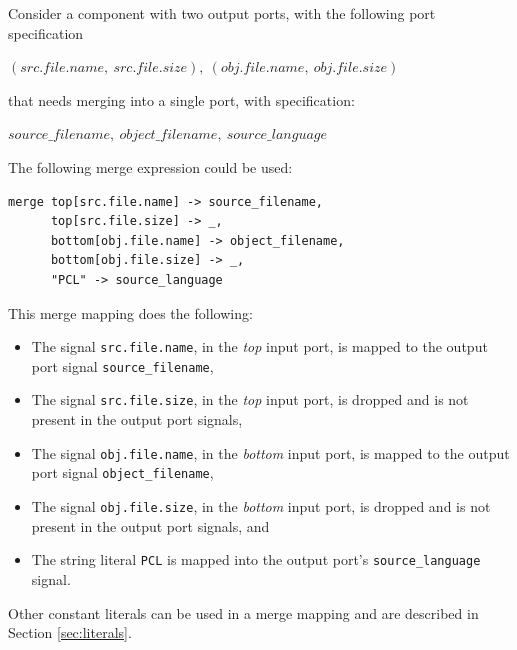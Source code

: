 Consider a component with two output ports, with the following port specification
\begin{center}
$(src.file.name,\ src.file.size),\ (obj.file.name,\ obj.file.size)$
\end{center}
that needs merging into a single port, with specification:
\begin{center}
$source\_filename,\ object\_filename,\ source\_language$
\end{center}
The following merge expression could be used:
\begin{center}
  \begin{verbatim}
merge top[src.file.name] -> source_filename,
      top[src.file.size] -> _,
      bottom[obj.file.name] -> object_filename,
      bottom[obj.file.size] -> _,
      "PCL" -> source_language
  \end{verbatim}
\end{center}
This merge mapping does the following:
\begin{itemize}
\item The signal \texttt{src.file.name}, in the \emph{top} input port, is mapped to the output port signal \texttt{source\_filename},
\item The signal \texttt{src.file.size}, in the \emph{top} input port, is dropped and is not present in the output port signals,
\item The signal \texttt{obj.file.name}, in the \emph{bottom} input port, is mapped to the output port signal \texttt{object\_filename},
\item The signal \texttt{obj.file.size}, in the \emph{bottom} input port, is dropped and is not present in the output port signals, and
\item The string literal \texttt{PCL} is mapped into the output port's \texttt{source\_language} signal.
\end{itemize}
Other constant literals can be used in a merge mapping and are described in Section \ref{sec:literals}.


